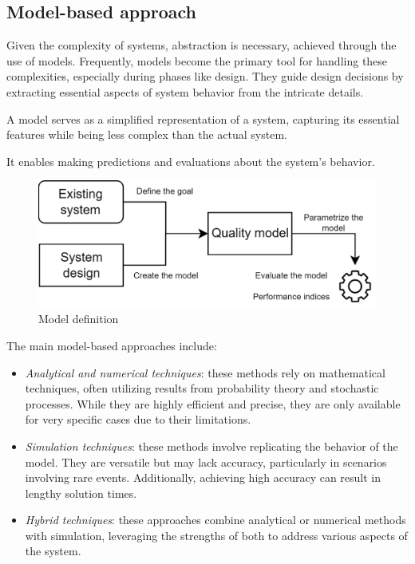 \subsection{Model-based approach}
Given the complexity of systems, abstraction is necessary, achieved through the use of models. 
Frequently, models become the primary tool for handling these complexities, especially during phases like design. 
They guide design decisions by extracting essential aspects of system behavior from the intricate details.

\begin{definition}
    A model serves as a simplified representation of a system, capturing its essential features while being less complex than the actual system.
\end{definition}
It enables making predictions and evaluations about the system's behavior.
\begin{figure}[H]
    \centering
    \includegraphics[width=0.5\linewidth]{images/model.png}
    \caption{Model definition}
\end{figure}

The main model-based approaches include:
\begin{itemize}
    \item \textit{Analytical and numerical techniques}: these methods rely on mathematical techniques, often utilizing results from probability theory and stochastic processes. 
        While they are highly efficient and precise, they are only available for very specific cases due to their limitations.
    \item \textit{Simulation techniques}: these methods involve replicating the behavior of the model. 
        They are versatile but may lack accuracy, particularly in scenarios involving rare events.
        Additionally, achieving high accuracy can result in lengthy solution times.
    \item \textit{Hybrid techniques}: these approaches combine analytical or numerical methods with simulation, leveraging the strengths of both to address various aspects of the system.
\end{itemize}